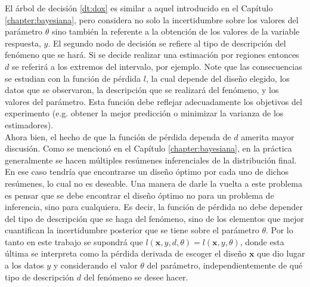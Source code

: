 El árbol de decisión \ref{dt:dox} es similar a aquel introducido en el Capítulo \ref{chapter:bayesiana}, pero considera no solo la incertidumbre sobre los valores del parámetro $\theta$ sino también la referente a la obtención de los valores de la variable respuesta, $y$. El segundo nodo de decisión se refiere al tipo de descripción  del fenómeno que se hará. Si se decide realizar una estimación por regiones entonces $d$ se referirá a los extremos del intervalo, por ejemplo. Note que las consecuencias se estudian con la función de pérdida $l$, la cual depende del diseño elegido, los datos que se observaron, la descripción que se realizará del fenómeno, y los valores del parámetro. Esta función debe reflejar adecuadamente los objetivos del experimento (e.g. obtener la mejor predicción o minimizar la varianza de los estimadores). \\


Ahora bien, el hecho de que la función de pérdida dependa de $d$ amerita mayor discusión. Como se mencionó en el Capítulo \ref{chapter:bayesiana}, en la práctica generalmente se hacen múltiples resúmenes inferenciales de la distribución final. En ese caso tendría que encontrarse un diseño óptimo por cada uno de dichos resúmenes, lo cual no es deseable. Una manera de darle la vuelta a este problema es pensar que se debe encontrar el diseño óptimo no para un problema de inferencia, sino para cualquiera. Es decir, la función de pérdida no debe depender del tipo de descripción que se haga del fenómeno, sino de los elementos que mejor cuantifican la incertidumbre posterior que se tiene sobre el parámetro $\theta$. Por lo tanto en este trabajo se supondrá que $l(\mathbf{x}, y, d, \theta) = l(\mathbf{x}, y, \theta)$, donde esta última se interpreta como la pérdida derivada de escoger el diseño $\mathbf{x}$ que dio lugar a los datos $y$ y considerando el valor $\theta$ del parámetro, independientemente de qué tipo de descripción $d$ del fenómeno se desee hacer. \\






